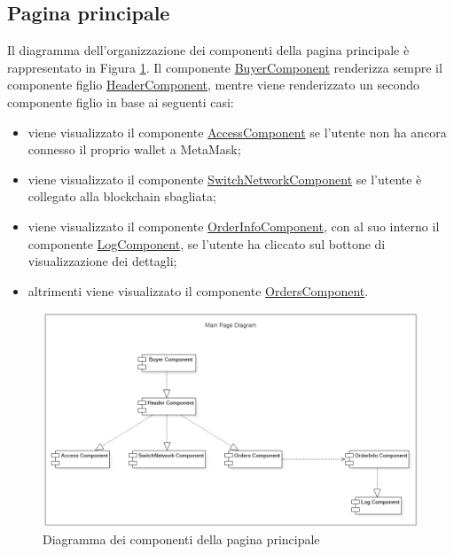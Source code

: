 \newpage

\subsection*{Pagina principale}
Il diagramma dell'organizzazione dei componenti della pagina principale è rappresentato in Figura \ref{fig:components-main-page}. Il componente \hyperref[sec:buyer-component]{BuyerComponent} renderizza sempre il componente figlio \hyperref[sec:header-component]{HeaderComponent}, mentre viene renderizzato un secondo componente figlio in base ai seguenti casi:
\begin{itemize}
    \item viene visualizzato il componente \hyperref[sec:access-component]{AccessComponent} se l'utente non ha ancora connesso il proprio wallet a MetaMask;
    \item viene visualizzato il componente \hyperref[sec:switch-component]{SwitchNetworkComponent} se l'utente è collegato alla blockchain sbagliata;
    \item viene visualizzato il componente \hyperref[sec:order-info-component]{OrderInfoComponent}, con al suo interno il componente \hyperref[sec:log-component]{LogComponent}, se l'utente ha cliccato sul bottone di visualizzazione dei dettagli;
    \item altrimenti viene visualizzato il componente \hyperref[sec:orders-component]{OrdersComponent}.
\end{itemize}

\begin{figure}[!h] 
    \centering 
    \includegraphics[width=0.8\columnwidth]{immagini/MainPageComponentsDiagram.png}
    \caption{Diagramma dei componenti della pagina principale}
    \label{fig:components-main-page}
\end{figure}

\newpage

